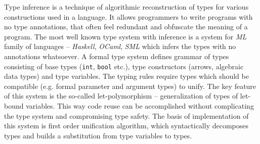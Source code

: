 \documentclass[inz, english, shortabstract]{iithesis}
\begin{document}
Type inference is a technique of algorithmic reconstruction of types for various constructions used in a language.
It allows programmers to write programs with no type annotations, that often feel redundant and obfuscate the meaning of a program.
The most well known type system with inference is a system for \emph{ML} family of languages\cite{Pierce2002} -- \emph{Haskell}, \emph{OCaml}, \emph{SML} which infers the types with no annotations whatsoever.
A formal type system defines grammar of types consisting of base types (\texttt{int}, \texttt{bool} etc.), type constructors (arrows, algebraic data types) and type variables.
The typing rules require types which should be compatible (e.g. formal parameter and argument types) to unify.
The key feature of this system is the so-called let-polymorphism -- generalization of types of let-bound variables.
This way code reuse can be accomplished without complicating the type system and compromising type safety.
The basis of implementation of this system is first order unification algorithm\cite{Pierce2002}, which syntactically decomposes types and builds a substitution from type variables to types.
\end{document}
